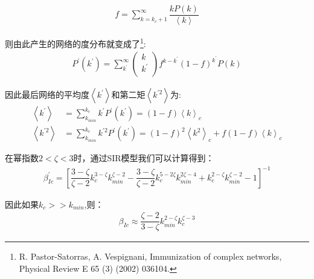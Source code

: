\documentclass[UTF8]{ctexart}
\begin{document}
\begin{equation}
	\begin{aligned}
		f=\sum\limits_{k=k_{c}+1}^{\infty}\dfrac{kP(k)}{\left\langle k \right\rangle}
	\end{aligned}
\end{equation}
\par 则由此产生的网络的度分布就变成了\footnote{R. Pastor-Satorras, A. Vespignani, Immunization of complex networks, Physical Review E 65 (3) (2002) 036104.}:
\begin{equation}
	\begin{aligned}
		P^{\prime}(k^{\prime})=\sum\limits_{k^{\prime}}^{\infty}\left( \begin{matrix}
			k  \\
			k^{\prime}  \\
		\end{matrix} \right)f^{k-k^{\prime}}(1-f)^{k^{\prime}}P(k)
	\end{aligned}
\end{equation}
\par 因此最后网络的平均度$\left\langle k^{\prime} \right\rangle$和第二矩$\left\langle k^{\prime2} \right\rangle$为:
\begin{equation}
	\begin{aligned}
		\left\langle k^{\prime} \right\rangle&=\sum\limits_{k_{min}}^{k_{c}}k^{\prime}P^{\prime}(k^{\prime})=(1-f)\left\langle k \right\rangle_{c}\\
		\left\langle k^{\prime2} \right\rangle&=\sum\limits_{k_{min}}^{k_{c}}k^{\prime2}P^{\prime}(k^{\prime})=(1-f)^{2}\left\langle k^{2} \right\rangle_{c}+f(1-f)\left\langle k \right\rangle_{c}
	\end{aligned}
\end{equation}
\par 在幂指数$2<\zeta<3$时，通过SIR模型我们可以计算得到：
\begin{equation}
	\begin{aligned}
		\beta_{Ic}^{\prime}=[\dfrac{3-\zeta}{\zeta-2}k_{c}^{3-\zeta}k_{min}^{\zeta-2}-\dfrac{3-\zeta}{\zeta-2}k_{c}^{5-2\zeta}k_{min}^{2\zeta-4}+k_{c}^{2-\zeta}k_{min}^{\zeta-2}-1]^{-1}
	\end{aligned}
\end{equation}
\par 因此如果$k_{c}>>k_{min}$,则：
\begin{equation}
	\begin{aligned}
		\beta_{Ic}\approx \dfrac{\zeta-2}{3-\zeta}k_{min}^{2-\zeta}k_{c}^{\zeta-3}
	\end{aligned}
\end{equation}
\end{document}
